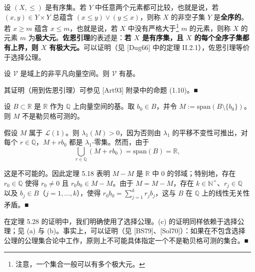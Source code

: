 \begin{remark}

\begin{items}
\item

设 $ (X, \le) $ 是有序集。若 $ Y $ 中任意两个元素都可比较，也就是说，若 $ (x, y) \in Y \times Y $ 总蕴含 $ (x \le y) \lor (y \le x) $，则称 $ X $ 的非空子集 $ Y $ 是\textbf{全序的}。若 $ x \ge m $ 蕴含 $ x \le m $，也就是说，若 $ X $ 中没有严格大于\footnote{注意，一个集合一般可以有多个极大元。} $ m $ 的元素，则称 $ X $ 的元素 $ m $ 为\textbf{极大元}。\textbf{佐恩引理}的表述是：\textbf{若 $ X $ 是有序集，且 $ X $ 的每个全序子集都有上界，则 $ X $ 有极大元。}可以证明（见 [Dug66] 中的定理 II.2.1），佐恩引理等价于选择公理。

\item

设 $ \mathcal{V} $ 是域上的非平凡向量空间。则 $ \mathcal{V} $ 有基。

\proofhead
其证明（用到佐恩引理）可参见 [Art93] 附录中的命题 (1.10)。\nobreak\hspace{0.35em}■
\item

设 $ B \subset \mathbb{R} $ 是 $ \mathbb{R} $ 作为 $ \mathbb{Q} $ 上向量空间的基。取 $ b_0 \in B $，并令 $ M := \mathrm{span}(B \setminus \{b_0\}) $。则 $ M $ 不是勒贝格可测的。

\proofhead
假设 $ M $ 属于 $ \mathcal{L}(1) $。则 $ \lambda_1(M) > 0 $，因为否则由 $ \lambda_1 $ 的平移不变性可推出，对每个 $ r \in \mathbb{Q} $，$ M + r b_0 $ 都是 $ \lambda_1 $-零集。然而，由于
\[
\bigcup_{r \in \mathbb{Q}} (M + r b_0) = \mathrm{span}(B) = \mathbb{R} ,
\]

这是不可能的。因此定理 5.18 表明 $ M - M $ 是 $ \mathbb{R} $ 中 $ 0 $ 的邻域；特别地，存在 $ r_0 \in \mathbb{Q} $ 使得 $ r_0 \ne 0 $ 且 $ r_0 b_0 \in M - M $。由于 $ M = M - M $，存在 $ k \in \mathbb{N}^{\times} $、$ r_j \in \mathbb{Q} $ 以及 $ b_j \in B $（$ j = 1, \ldots, k $），使得 $ r_0 b_0 = \sum_{j=1}^{k} r_j b_j $，这与 $ B $ 在 $ \mathbb{Q} $ 上的线性无关性矛盾。\nobreak\hspace{0.35em}■

\item

在定理 5.28 的证明中，我们明确使用了选择公理。(c) 的证明同样依赖于选择公理；见 (a) 与 (b)。事实上，可以证明（见 [BS79]、[Sol70]）：如果在不包含选择公理的公理集合论中工作，原则上不可能具体指定一个不是勒贝格可测的集合。\nobreak\hspace{0.35em}■

\end{items}

\end{remark}

